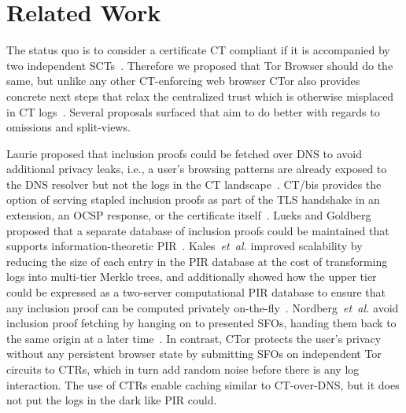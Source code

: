 \section{Related Work} \label{sec:related}
The status quo is to consider a certificate CT compliant if it is accompanied by
two independent SCTs~\cite{chrome-policy,apple-on-independence}.  Therefore we
proposed that Tor Browser should do the same, but unlike any other CT-enforcing
web browser CTor also provides concrete next steps that relax the centralized
trust which is otherwise misplaced in CT logs~\cite{%
izenpe-disqualified,%
	venafi-disqualified,%
	gdca1-omission,%
	digicert-log-compromised%
}.  Several proposals surfaced that aim to do better with regards to omissions
and split-views.

Laurie proposed that inclusion proofs could be fetched over DNS to avoid
additional privacy leaks, i.e., a user's browsing patterns are already exposed
to the DNS resolver but not the logs in the CT landscape~\cite{ct-over-dns}.
CT/bis provides the option of serving stapled inclusion proofs as part of the
TLS handshake in an extension, an OCSP response, or the certificate
itself~\cite{ct/bis}. Lueks and Goldberg proposed that a separate database of
inclusion proofs could be maintained that supports information-theoretic
PIR~\cite{lueks-and-goldberg}. Kales~\emph{et~al.} improved scalability by
reducing the size of each entry in the PIR database at the cost of transforming
logs into multi-tier Merkle trees, and additionally showed how the upper tier
could be expressed as a two-server computational PIR database to ensure that any
inclusion proof can be computed privately on-the-fly~\cite{kales}.
Nordberg~\emph{et~al.} avoid inclusion proof fetching by hanging on to presented
SFOs, handing them back to the same origin at a later time~\cite{nordberg}. In
contrast, CTor protects the user's privacy without any persistent browser state
by submitting SFOs on independent Tor circuits to CTRs, which in turn add random
noise before there is any log interaction.  The use of CTRs enable caching
similar to CT-over-DNS, but it does not put the logs in the dark like PIR could.

